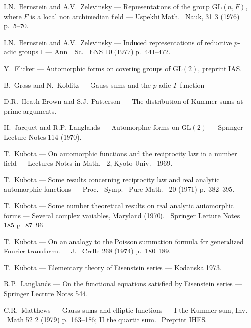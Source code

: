 \documentclass[12pt,a4paper]{article}
\theoremstyle{plain}
\theoremstyle{definition}
\theoremstyle{remark}
\begin{document}
\begin{enumerate}[label={[\arabic*]}]
\item I.N.\ Bernstein and A.V.\ Zelevinsky --- Representations of the group $\mathrm{GL}(n, F)$, where $F$ is a local non archimedian field --- Uspekhi Math.
\ Nauk, 31 3 (1976) p.\ 5--70.

\item I.N.\ Bernstein and A.V.\ Zelevinsky --- Induced representations of reductive $p$-adic groups I --- Ann.
\ Sc.
\ ENS 10 (1977) p.\ 441--472.

\item Y.\ Flicker --- Automorphic forms on covering groups of $\mathrm{GL}(2)$, preprint IAS.

\item B.\ Gross and N.\ Koblitz --- Gauss sums and the $p$-adic $\Gamma$-function.

\item D.R.\ Heath-Brown and S.J.\ Patterson --- The distribution of Kummer sums at prime arguments.

\item H.\ Jacquet and R.P.\ Langlands --- Automorphic forms on $\mathrm{GL}(2)$ --- Springer Lecture Notes 114 (1970).

\item T.\ Kubota --- On automorphic functions and the reciprocity law in a number field --- Lectures Notes in Math.
\ 2, Kyoto Univ.
\ 1969.

\item T.\ Kubota --- Some results concerning reciprocity law and real analytic automorphic functions --- Proc.
\ Symp.
\ Pure Math.
\ 20 (1971) p.\ 382--395.

\item T.\ Kubota --- Some number theoretical results on real analytic automorphic forms --- Several complex variables, Maryland (1970).
\ Springer Lecture Notes 185 p.\ 87--96.

\item T.\ Kubota --- On an analogy to the Poisson summation formula for generalized Fourier transforms --- J.
\ Crelle 268 (1974) p.\ 180--189.

\item T.\ Kubota --- Elementary theory of Eisenstein series --- Kodanska 1973.

\item R.P.\ Langlands --- On the functional equations satisfied by Eisenstein series --- Springer Lecture Notes 544.

\item C.R.\ Matthews --- Gauss sums and elliptic functions --- I the Kummer sum, Inv.
\ Math 52 2 (1979) p.\ 163--186; II the quartic sum.
\ Preprint IHES.


\end{enumerate}
\end{document}
